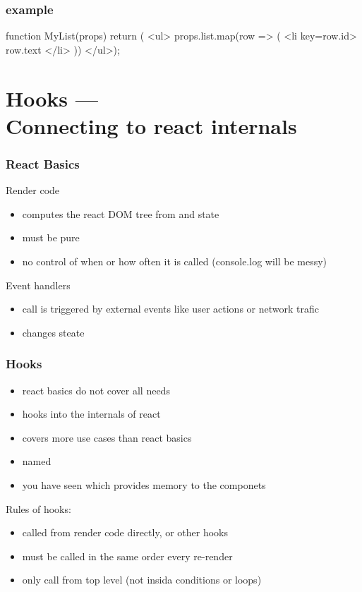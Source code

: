 \begin{frame}[fragile] \frametitle{ example}

\begin{CodeBox}{}
function MyList(props) { return (
  <ul>
    {props.list.map(row => (
      <li key={row.id}>
        {row.text}
      </li>
    ))}
  </ul>);
}
\end{CodeBox}
\end{frame}

\section{Hooks ---\\Connecting to react internals}
\begin{frame}[fragile] \frametitle{React Basics}
Render code
\begin{itemize}
  \item computes the react DOM tree from  and state
  \item must be pure
  \item no control of when or how often it is called (console.log will be messy)
\end{itemize}
\vspace{5mm}
Event handlers
\begin{itemize}
  \item call is triggered by external events like user actions or network trafic
  \item changes steate
\end{itemize}
\end{frame}

\begin{frame}[fragile] \frametitle{Hooks}
\begin{itemize}
  \item react basics do not cover all needs
  \item hooks into the internals of react
  \item covers more use cases than react basics
  \item named 
  \item you have seen  which provides memory to the componets
\end{itemize}
\vspace{5mm}
Rules of hooks:
\begin{itemize}
  \item called from render code directly, or other hooks
  \item must be called in the same order every re-render
  \item only call from top level (not insida conditions or loops)
\end{itemize}
\end{frame}

